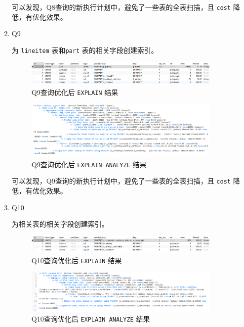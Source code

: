 \documentclass{article}
\renewcommand\tt{\texttt}
\begin{document}
\begin{enumerate}
可以发现，Q8查询的新执行计划中，避免了一些表的全表扫描，且 \tt{cost} 降低，有优化效果。

  \item Q9
  
为 \tt{lineitem} 表和\tt{part} 表的相关字段创建索引。

\begin{figure}[H]
\centering
\includegraphics[width=0.9\textwidth]{img/61.png}
\caption{Q9查询优化后 \tt{EXPLAIN} 结果}
\end{figure}

\begin{figure}[H]
\centering
\includegraphics[width=0.9\textwidth]{img/62.png}
\caption{Q9查询优化后 \tt{EXPLAIN ANALYZE} 结果}
\end{figure}

可以发现，Q9查询的新执行计划中，避免了一些表的全表扫描，且 \tt{cost} 降低，有优化效果。

  \item Q10
  
为相关表的相关字段创建索引。

\begin{figure}[H]
\centering
\includegraphics[width=0.9\textwidth]{img/63.png}
\caption{Q10查询优化后 \tt{EXPLAIN} 结果}
\end{figure}

\begin{figure}[H]
\centering
\includegraphics[width=0.9\textwidth]{img/64.png}
\caption{Q10查询优化后 \tt{EXPLAIN ANALYZE} 结果}
\end{figure}


\end{enumerate}
\end{document}
